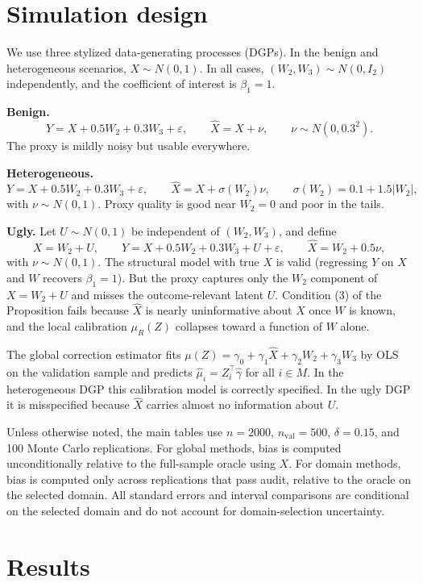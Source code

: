 \documentclass[11pt]{article}
\newcommand{\1}{\mathbf{1}}
\begin{document}
\section{Simulation design}

We use three stylized data-generating processes (DGPs). In the benign and heterogeneous scenarios, $X\sim N(0,1)$. In all cases, $(W_2,W_3)\sim N(0,I_2)$ independently, and the coefficient of interest is $\beta_1=1$.

\textbf{Benign.}
\[
Y = X + 0.5W_2 + 0.3W_3 + \varepsilon,
\qquad
\hat X = X + \nu,
\qquad
\nu\sim N(0,0.3^2).
\]
The proxy is mildly noisy but usable everywhere.

\textbf{Heterogeneous.}
\[
Y = X + 0.5W_2 + 0.3W_3 + \varepsilon,
\qquad
\hat X = X + \sigma(W_2)\nu,
\qquad
\sigma(W_2)=0.1 + 1.5|W_2|,
\]
with $\nu\sim N(0,1)$. Proxy quality is good near $W_2=0$ and poor in the tails.

\textbf{Ugly.} Let $U\sim N(0,1)$ be independent of $(W_2,W_3)$, and define
\[
X = W_2 + U,
\qquad
Y = X + 0.5W_2 + 0.3W_3 + U + \varepsilon,
\qquad
\hat X = W_2 + 0.5\nu,
\]
with $\nu\sim N(0,1)$. The structural model with true $X$ is valid (regressing $Y$ on $X$ and $W$ recovers $\beta_1=1$). But the proxy captures only the $W_2$ component of $X=W_2+U$ and misses the outcome-relevant latent $U$. Condition (3) of the Proposition fails because $\hat X$ is nearly uninformative about $X$ once $W$ is known, and the local calibration $\mu_R(Z)$ collapses toward a function of $W$ alone.

The global correction estimator fits $\mu(Z)=\gamma_0+\gamma_1\hat X+\gamma_2 W_2 + \gamma_3 W_3$ by OLS on the validation sample and predicts $\hat\mu_i=Z_i^\top\hat\gamma$ for all $i\in M$. In the heterogeneous DGP this calibration model is correctly specified. In the ugly DGP it is misspecified because $\hat X$ carries almost no information about $U$.

Unless otherwise noted, the main tables use $n=2000$, $n_{\mathrm{val}}=500$, $\delta=0.15$, and 100 Monte Carlo replications. For global methods, bias is computed unconditionally relative to the full-sample oracle using $X$. For domain methods, bias is computed only across replications that pass audit, relative to the oracle on the selected domain. All standard errors and interval comparisons are conditional on the selected domain and do not account for domain-selection uncertainty.

\section{Results}
\end{document}
